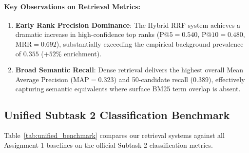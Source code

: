 \paragraph{Key Observations on Retrieval Metrics:}
\begin{enumerate}
    \item \textbf{Early Rank Precision Dominance}: The Hybrid RRF system achieves a dramatic increase in high-confidence top ranks ($\text{P@5} = 0.540$, $\text{P@10} = 0.480$, $\text{MRR} = 0.692$), substantially exceeding the empirical background prevalence of $0.355$ ($+52\%$ enrichment).
    \item \textbf{Broad Semantic Recall}: Dense retrieval delivers the highest overall Mean Average Precision ($\text{MAP} = 0.323$) and 50-candidate recall ($0.389$), effectively capturing semantic equivalents where surface BM25 term overlap is absent.
\end{enumerate}

\subsection{Unified Subtask 2 Classification Benchmark}
Table~\ref{tab:unified_benchmark} compares our retrieval systems against all Assignment 1 baselines on the official Subtask 2 classification metrics.

